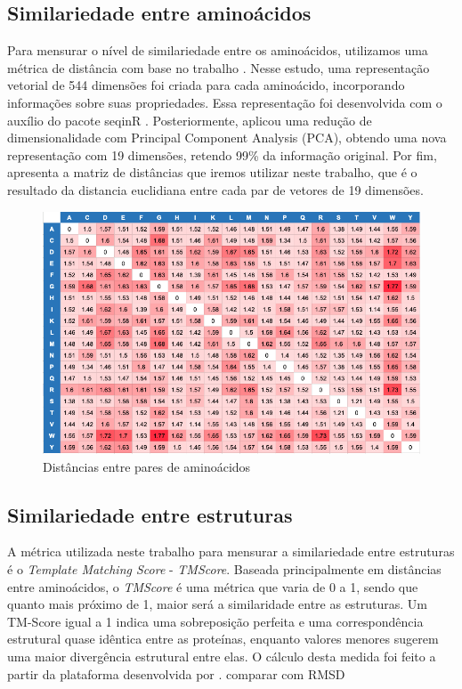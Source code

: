 \subsection{Similariedade entre aminoácidos}
Para mensurar o nível de similariedade entre os aminoácidos, utilizamos uma métrica de distância com base no trabalho \cite{aminodist}.
Nesse estudo, uma representação vetorial de 544 dimensões foi criada para cada aminoácido, incorporando informações sobre suas propriedades.
Essa representação foi desenvolvida com o auxílio do pacote seqinR \cite{seqinR}. 
Posteriormente, \cite{aminodist} aplicou uma redução de dimensionalidade com Principal Component Analysis (PCA), 
obtendo uma nova representação com 19 dimensões, retendo 99\% da informação original. 
Por fim, \cite{aminodist} apresenta a matriz de distâncias que iremos utilizar neste trabalho,
que é o resultado da distancia euclidiana entre cada par de vetores de 19 dimensões. 

\begin{figure}[H]
    \centering
    \includegraphics[width=.8\textwidth]{figuras/matrix_amino_dist.png}
    \caption{Distâncias entre pares de aminoácidos \cite{aminodist}}
    \label{fig:matrixaminodist}
  \end{figure}


\subsection{Similariedade entre estruturas}
\label{subsection:tmscore}
A métrica utilizada neste trabalho para mensurar a similariedade entre estruturas é o \textit{Template Matching Score} - \textit{TMScore}. 
Baseada principalmente em distâncias entre aminoácidos, o \textit{TMScore} é uma métrica que varia de 0 a 1,
sendo que quanto mais próximo de 1, maior será a similaridade entre as estruturas. 
Um TM-Score igual a 1 indica uma sobreposição perfeita e uma correspondência estrutural quase idêntica entre as proteínas, 
enquanto valores menores sugerem uma maior divergência estrutural entre elas. 
O cálculo desta medida foi feito a partir da plataforma desenvolvida por \cite{USalign}.
{\color{red} comparar com RMSD }


